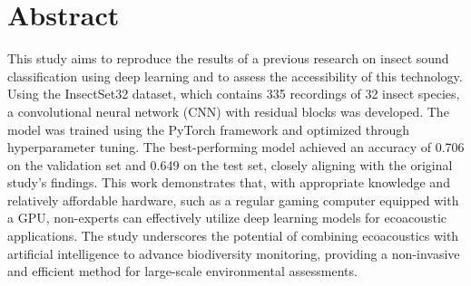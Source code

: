 

\vspace*{\fill}

\section*{Abstract}
\label{abstract}

This study aims to reproduce the results of a previous research on insect sound 
classification using deep learning and to assess the accessibility of this technology. 
Using the InsectSet32 dataset, which contains 335 recordings of 32 insect species, a 
convolutional neural network (CNN) with residual blocks was developed. The model was trained using the 
PyTorch framework and optimized through hyperparameter tuning. The best-performing model 
achieved an accuracy of 0.706 on the validation set and 0.649 on the test set, 
closely aligning with the original study's findings. This work demonstrates that, 
with appropriate knowledge and relatively affordable hardware, such as a regular 
gaming computer equipped with a GPU, non-experts can effectively utilize deep 
learning models for ecoacoustic applications. The study underscores the potential 
of combining ecoacoustics with artificial intelligence to advance biodiversity monitoring, 
providing a non-invasive and efficient method for large-scale environmental assessments.

\vspace*{\fill}